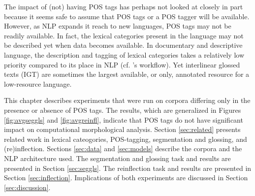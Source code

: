 
The impact of (not) having POS tags has perhaps not looked at closely in part because it seems safe to assume that POS tags or a POS tagger will be available. However, as NLP expands it reach to new languages, POS tags may not be readily available. 
In fact, the lexical categories present in the language may not be described yet when data becomes available. In documentary and descriptive language, the description and tagging of lexical categories takes a relatively low priority compared to its place in NLP (cf. \citet{bird_machine_2012}'s workflow). Yet interlinear glossed texts (IGT) are sometimes the largest available, or only, annotated resource for a low-resource language. 

This chapter describes experiments that were run on corpora differing only in the presence or absence of POS tags. The results, which are generalized in Figures \ref{fig:avgseggls} and \ref{fig:avgreinfl}, indicate that POS tags do not have significant impact on computational morphological analysis. 
Section \ref{sec:related} presents related work in lexical cateogories, POS-tagging, segmentation and glossing, and (re)inflection. Sections \ref{sec:data} and \ref{sec:models} describe the corpora and the NLP architecture used. The segmentation and glossing task and results are presented in Section \ref{sec:seggls}. The reinflection task and results are presented in Section \ref{sec:inflection}. Implications of both experiments are discussed in Section \ref{sec:discussion}.


